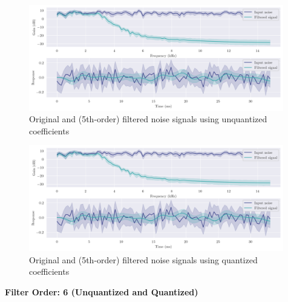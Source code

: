 \begin{figure}[!ht]
    \centering
    \includegraphics[width=0.99\textwidth]{images/q8_5th_stability.png}
    \caption{Original and (5th-order) filtered noise signals using unquantized coefficients}
\end{figure}

\begin{figure}[!ht]
    \centering
    \includegraphics[width=0.99\textwidth]{images/q8_q5th_stability.png}
    \caption{Original and (5th-order) filtered noise signals using quantized coefficients}
\end{figure}

\newpage
{\Large\textbf{Filter Order: 6 (Unquantized and Quantized)}}
\vfill

